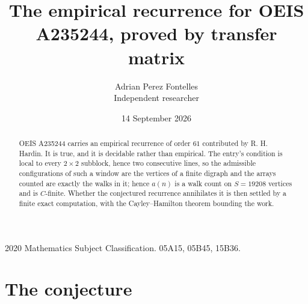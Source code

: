 \documentclass[11pt,a4paper]{article}
\title{The empirical recurrence for OEIS A235244, proved by transfer matrix}
\author{Adrian Perez Fontelles\\ \small Independent researcher}
\date{14 September 2026}
\theoremstyle{plain}
\theoremstyle{definition}
\begin{document}
\maketitle

\begin{abstract}
OEIS A235244 carries an empirical recurrence of order $61$ contributed by R. H. Hardin. It is
true, and it is decidable rather than empirical. The entry's condition is local to every $2\times2$ subblock, hence two consecutive lines, so
the admissible configurations of such a window are the vertices of a finite digraph and the
arrays counted are exactly the walks in it; hence $a(n)$ is a walk count on $S=19208$ vertices
and is $C$-finite. Whether the conjectured recurrence annihilates it is then settled by a
finite exact computation, with the Cayley--Hamilton theorem bounding the work.
\end{abstract}

\noindent\small 2020 Mathematics Subject Classification. 05A15, 05B45, 15B36.\normalsize

\section{The conjecture}
\end{document}
